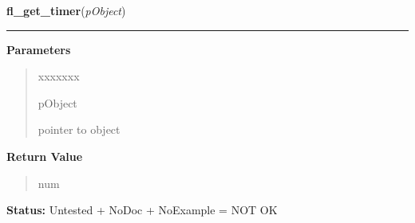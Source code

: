 \hspace{.8\funcindent}\begin{boxedminipage}{\funcwidth}

    \raggedright \textbf{fl\_get\_timer}(\textit{pObject})

    \vspace{-1.5ex}

    \rule{\textwidth}{0.5\fboxrule}
\setlength{\parskip}{2ex}
\setlength{\parskip}{1ex}
      \textbf{Parameters}
      \vspace{-1ex}

      \begin{quote}
        \begin{Ventry}{xxxxxxx}

          \item[pObject]

          pointer to object

        \end{Ventry}

      \end{quote}

      \textbf{Return Value}
    \vspace{-1ex}

      \begin{quote}
      num

      \end{quote}

\textbf{Status:} Untested + NoDoc + NoExample = NOT OK



    \end{boxedminipage}

    \label{xformslib:library:fl_set_timer_countup}

    \vspace{0.5ex}

